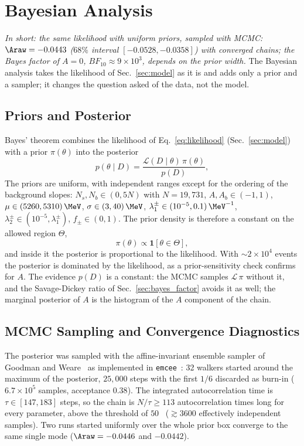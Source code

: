 \section{Bayesian Analysis}
\label{sec:bayesian}
\emph{In short: the same likelihood with uniform priors, sampled with MCMC: $\Araw=-0.0443$ ($68\%$ interval $[-0.0528,-0.0358]$) with converged chains; the Bayes factor of $A=0$, $BF_{10}\approx9\times10^3$, depends on the prior width.}
The Bayesian analysis takes the likelihood of Sec.~\ref{sec:model} as it is and adds only a prior and a sampler; it changes the question asked of the data, not the model.
\subsection{Priors and Posterior}
\label{sec:bayes_prior}
Bayes' theorem combines the likelihood of Eq.~\eqref{eq:likelihood} (Sec.~\ref{sec:model}) with a prior $\pi(\theta)$ into the posterior
\begin{equation}
p(\theta\mid D)=\frac{\mathcal{L}(D\mid\theta)\,\pi(\theta)}{p(D)},
\label{eq:bayes}
\end{equation}
The priors are uniform, with independent ranges except for the ordering of the background slopes: $N_s,N_b\in(0,5N)$ with $N=19{,}731$, $A,A_b\in(-1,1)$, $\mu\in(5260,5310)\,\MeV$, $\sigma\in(3,40)\,\MeV$, $\lambda_1^{\pm}\in(10^{-5},0.1)\,\MeV^{-1}$, $\lambda_2^{\pm}\in(10^{-5},\lambda_1^{\pm})$, $f_{\pm}\in(0,1)$. The prior density is therefore a constant on the allowed region $\Theta$,
\begin{equation}
\pi(\theta)\propto\mathbf{1}\left[\theta\in\Theta\right],
\label{eq:prior}
\end{equation}
and inside it the posterior is proportional to the likelihood. With $\sim$$2\times10^4$ events the posterior is dominated by the likelihood, as a prior-sensitivity check confirms for $A$. The evidence $p(D)$ is a constant: the MCMC samples $\mathcal{L}\,\pi$ without it, and the Savage-Dickey ratio of Sec.~\ref{sec:bayes_factor} avoids it as well; the marginal posterior of $A$ is the histogram of the $A$ component of the chain.
\subsection{MCMC Sampling and Convergence Diagnostics}
\label{sec:bayes_mcmc}
The posterior was sampled with the affine-invariant ensemble sampler of Goodman and Weare~\cite{goodman_weare} as implemented in \texttt{emcee}~\cite{emcee}: 32 walkers started around the maximum of the posterior, $25{,}000$ steps with the first $1/6$ discarded as burn-in ($6.7\times10^5$ samples, acceptance $0.38$). The integrated autocorrelation time is $\tau\in[147,183]$ steps, so the chain is $N/\tau\geq113$ autocorrelation times long for every parameter, above the threshold of $50$~\cite{emcee} ($\gtrsim3600$ effectively independent samples). Two runs started uniformly over the whole prior box converge to the same single mode ($\Araw=-0.0446$ and $-0.0442$).
